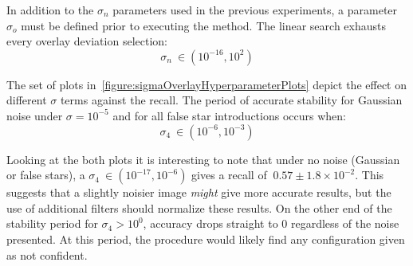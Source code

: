 In addition to the $\sigma_n$ parameters used in the previous experiments, a parameter $\sigma_o$ must be defined
prior to executing the  method.
The linear search exhausts every overlay deviation selection:
\begin{equation}
    \label{eq:linearSearchSigmaOverlay}
    \sigma_n \ \in (10^{-16}, 10^{2})
\end{equation}

\begin{figure}
\end{figure}

The set of plots in~\autoref{figure:sigmaOverlayHyperparameterPlots} depict the effect on different $\sigma$ terms
against the recall.
The period of accurate stability for Gaussian noise under $\sigma = 10^{-5}$ and for all false star introductions occurs
when:
\begin{equation}
    \label{eq:sigmaOverlayStableRegion}
    \sigma_4 \ \in (10^{-6}, 10^{-3})
\end{equation}

Looking at the both plots it is interesting to note that under no noise (Gaussian or false stars), a $\sigma_4 \ \in
(10^{-17}, 10^{-6})$ gives a recall of $~0.57 \pm 1.8 \times 10^{-2}$.
This suggests that a slightly noisier image \textit{might} give more accurate  results, but the use of
additional filters should normalize these results.
On the other end of the stability period for $\sigma_4 > 10^0$, accuracy drops straight to 0 regardless of the noise
presented.
At this period, the  procedure would likely find any configuration given as not confident.

